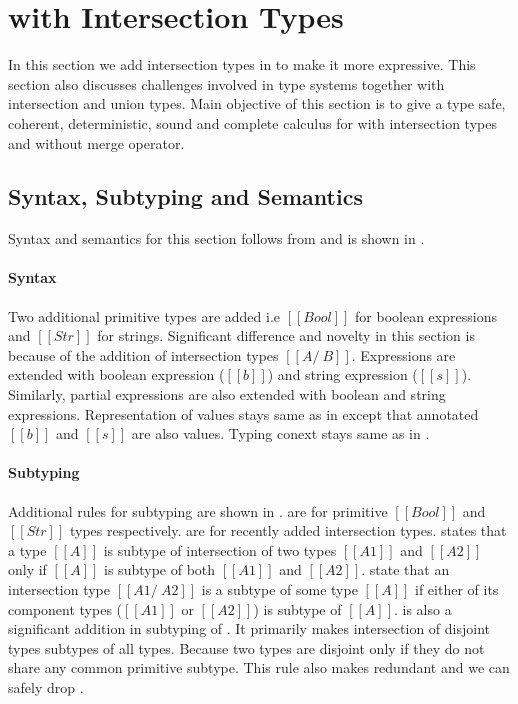 \section{\cal with Intersection Types}
\label{sec:inter}
In this section we add intersection types in \cal to make it more expressive. This section also
discusses challenges involved in type systems together with intersection and union types.
Main objective of this section is to give a type safe, coherent, deterministic, sound and complete
calculus for \cal with intersection types and without merge operator.

\subsection{Syntax, Subtyping and Semantics}
\label{sec:inter:system}
Syntax and semantics for this section follows from  and is shown in .

\paragraph{Syntax}
Two additional primitive types are added i.e $[[Bool]]$ for boolean expressions and $[[Str]]$ for strings.
Significant difference and novelty in this section is because of the addition of intersection types 
$[[A /\ B]]$. Expressions are extended with boolean expression ($[[b]]$) and string expression ($[[s]]$).
Similarly, partial expressions are also extended with boolean and string expressions.
Representation of values stays same as in  except that annotated $[[b]]$ and $[[s]]$
are also values. Typing conext stays same as in .

\paragraph{Subtyping}
Additional rules for subtyping are shown in .
 are for primitive $[[Bool]]$ and $[[Str]]$ types respectively.
 are for recently added intersection types.  states that
a type $[[A]]$ is subtype of intersection of two types $[[A1]]$ and $[[A2]]$ only if $[[A]]$ is 
subtype of both $[[A1]]$ and $[[A2]]$.  state that an intersection type 
$[[A1 /\ A2]]$ is a subtype of some type $[[A]]$ if either of its component types ($[[A1]]$ or $[[A2]]$)
is subtype of $[[A]]$.  is also a significant addition in subtyping of \cal. It primarily
makes intersection of disjoint types subtypes of all types. 
Because two types are disjoint only if they do not share any common primitive subtype.
This rule also makes  redundant and we can safely drop .

